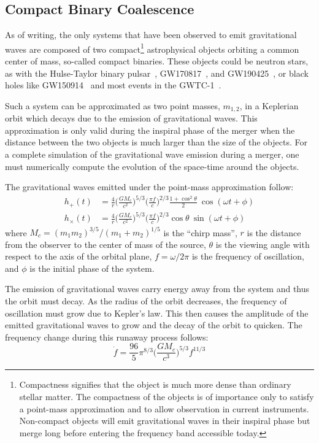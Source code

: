 \documentclass [12pt, proquest]{uwthesis}[2019]
\begin{document}
\subsection{Compact Binary Coalescence}\label{CBC}

As of writing, the only systems that have been observed to emit gravitational waves are composed of two compact\footnote{Compactness signifies that the object is much more dense than ordinary stellar matter. The compactness of the objects is of importance only to satisfy a point-mass approximation and to allow observation in current instruments. Non-compact objects will emit gravitational waves in their inspiral phase but merge long before entering the frequency band accessible today.} astrophysical objects orbiting a common center of mass, so-called compact binaries. These objects could be neutron stars, as with the Hulse-Taylor binary pulsar~\cite{hulseTaylor}, GW170817~\cite{GW170817}, and GW190425~\cite{GW190425}, or black holes like GW150914~\cite{GW150914} and most events in the GWTC-1~\cite{GWTC}.

Such a system can be approximated as two point masses, $m_{1,2}$, in a Keplerian orbit which decays due to the emission of gravitational waves. This approximation is only valid during the inspiral phase of the merger when the distance between the two objects is much larger than the size of the objects. For a complete simulation of the gravitational wave emission during a merger, one must numerically compute the evolution of the space-time around the objects.~\cite{NGR}

The gravitational waves emitted under the point-mass approximation follow:
\begin{align}
h_+(t)&=\frac{4}{r}\bigg(\frac{GM_c}{c^2}\bigg)^{5/3} \bigg( \frac{\pi f}{c} \bigg)^{2/3} \frac{1+\cos^2\theta}{2} \ \cos(\omega t + \phi)\\
h_\times(t)&=\frac{4}{r}\bigg(\frac{GM_c}{c^2}\bigg)^{5/3} \bigg( \frac{\pi f}{c} \bigg)^{2/3} \cos\theta\ \sin(\omega t + \phi)
\end{align}
where $M_c=(m_1 m_2)^{3/5}/(m_1+m_2)^{1/5}$ is the ``chirp mass'', $r$ is the distance from the observer to the center of mass of the source, $\theta$ is the viewing angle with respect to the axis of the orbital plane, $f=\omega/2\pi$ is the frequency of oscillation, and $\phi$ is the initial phase of the system.

The emission of gravitational waves carry energy away from the system and thus the orbit must decay. As the radius of the orbit decreases, the frequency of oscillation must grow due to Kepler's law. This then causes the amplitude of the emitted gravitational waves to grow and the decay of the orbit to quicken. The frequency change during this runaway process follows:
\begin{equation}
\dot{f}=\frac{96}{5}\pi^{8/3}\bigg(\frac{G M_c}{c^3}\bigg)^{5/3} f^{11/3}
\end{equation}
\end{document}
